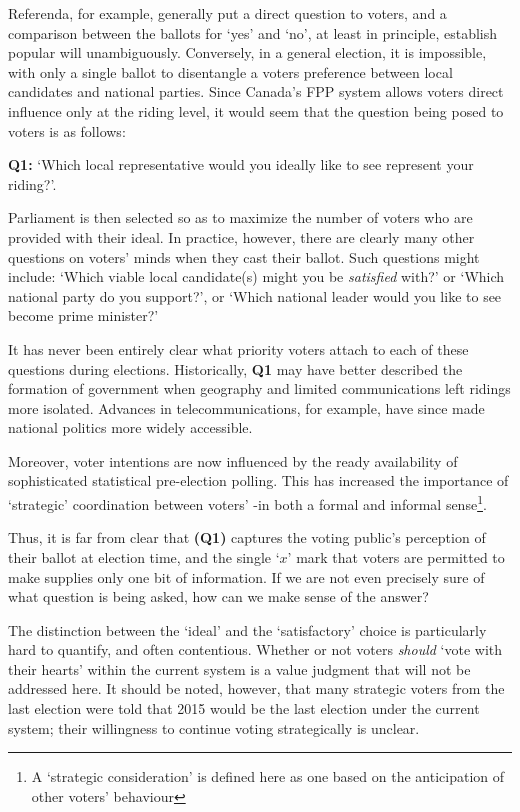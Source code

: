 \documentclass[DIV=calc, paper=a4, fontsize=11pt, twocolumn]{scrartcl}	 %
\begin{document}
Referenda, for example, generally put a direct question to voters, and a comparison between the ballots for `yes' and `no', at least in principle, establish popular will unambiguously. 
Conversely, in a general election, it is impossible, with only a single ballot to disentangle a voters preference between local candidates and national parties.
Since Canada's FPP system allows voters direct influence only at the riding level, it would seem that the question being posed to voters is as follows:

\begin{tcolorbox}[colback=white!5!white,colframe=blue!55!black]
{\textbf{Q1:} } `Which local representative would you ideally like to see represent your riding?'. 
\end{tcolorbox}

Parliament is then selected so as to maximize the number of voters who are provided with their ideal. 
In practice, however, there are clearly many other questions on voters' minds when they cast their ballot. 
Such questions might include: `Which viable local candidate(s) might you be \emph{satisfied} with?'  or `Which national party do you support?', or `Which national leader would you like to see become prime minister?' 

It has never been entirely clear what priority voters attach to each of these questions during elections. Historically, \textbf{Q1} may have better described the formation of government when geography and limited communications left ridings more isolated.
Advances in telecommunications, for example, have since made national politics more widely accessible. 

Moreover, voter intentions are now influenced by the ready availability of sophisticated statistical pre-election polling. This has increased the importance of `strategic' coordination  between voters' \--in both a formal\cite{Leadnow_environics} and informal sense\footnote{A `strategic  consideration' is defined here as one based on the anticipation of other voters' behaviour}. 

Thus, it is far from clear that \textbf{(Q1)} captures the voting public's perception of their ballot at election time, and the single `$x$' mark that voters are permitted to make supplies only one bit of information.
If we are not even precisely sure of what question is being asked, how can we make sense of the answer?

The distinction between the `ideal' and the `satisfactory' choice is particularly hard to quantify, and often contentious.
Whether or not voters \emph{should} `vote with their hearts' within the current system is a value judgment that will not be addressed here. It should be noted, however, that many strategic voters from the last election were told that 2015 would be the last election under the current system;  their willingness to continue voting strategically is unclear.
\end{document}
